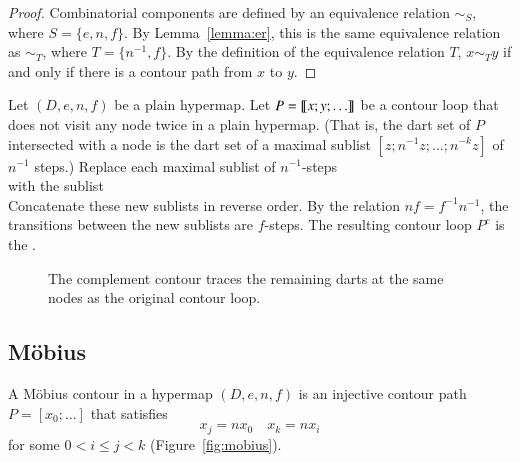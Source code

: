 \begin{proof} 
Combinatorial components are defined by an equivalence relation $\sim_S$, where
$S = \{e,n,f\}$.  By Lemma~\ref{lemma:er}, this is the same equivalence relation as
$\sim_T$, where $T = \{n^{-1},f\}$.  By the definition of the equivalence relation $T$,
$x\sim_T y$ if and only if there is a contour path from $x$ to $y$.
\end{proof}
%

\begin{definition}[complement] 
Let $(D,e,n,f)$ be a plain hypermap.
Let $P={\llbracket{x;y;\ldots}\rrbracket}$ be a contour loop that does not visit any node
twice in a plain hypermap.   (That is, the dart set of $P$ intersected with a node
is the dart set of a maximal sublist $[z;n^{-1}z;\ldots;n^{-k}z]$ of $n^{-1}$ steps.)
 Replace each maximal sublist of
$n^{-1}$-steps
\begin{displaymath}
[z;n^{-1} z; \ldots; n^{-k} z]
\end{displaymath}
with the sublist
\begin{displaymath}
[n^{-(k+1)} z;n^{-(k+2)} z;\ldots; n z]
\end{displaymath}
Concatenate these new sublists in reverse order.  By the relation $n f = f^{-1} n^{-1}$,
the transitions between the new sublists are $f$-steps.
The resulting contour loop $P^c$
is the . 
\end{definition}

\begin{figure}[htb]
\centering
{}
\caption{The complement contour traces the remaining darts
at the same nodes as the original contour loop. }
\label{fig:contour-comp}
\end{figure}


\subsection{M\"obius}

\begin{definition}
 A M\"obius contour in a hypermap
$(D,e,n,f)$ is an
injective contour path $P=[x_0;\ldots]$ that satisfies
\begin{equation}
\label{eqn:mobius}
x_j = n x_0\quad x_k = n x_i
\end{equation}
for some $0 < i\le j< k$ (Figure~\ref{fig:mobius}).
%
\end{definition}


